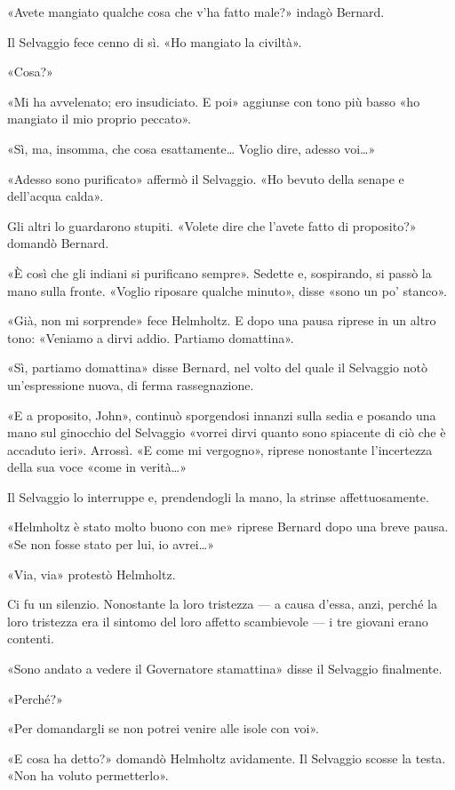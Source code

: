 \documentclass[
a5paper, %
10pt, %
twoside, 
onecolumn, %
openany, %
]{memoir}
\begin{document}
«Avete mangiato qualche cosa che v’ha fatto male?» indagò Bernard.

Il Selvaggio fece cenno di sì. «Ho mangiato la civiltà».

«Cosa?»

«Mi ha avvelenato; ero insudiciato. E poi» aggiunse con tono più basso «ho mangiato il mio proprio peccato».

«Sì, ma, insomma, che cosa esattamente… Voglio dire, adesso voi…»

«Adesso sono purificato» affermò il Selvaggio. «Ho bevuto della senape e dell’acqua calda».

Gli altri lo guardarono stupiti. «Volete dire che l’avete fatto di proposito?» domandò Bernard.

«È così che gli indiani si purificano sempre». Sedette e, sospirando, si passò la mano sulla fronte. «Voglio riposare qualche minuto», disse «sono un po’ stanco».

«Già, non mi sorprende» fece Helmholtz. E dopo una pausa riprese in un altro tono: «Veniamo a dirvi addio. Partiamo domattina».

«Sì, partiamo domattina» disse Bernard, nel volto del quale il Selvaggio notò un’espressione nuova, di ferma rassegnazione.

«E a proposito, John», continuò sporgendosi innanzi sulla sedia e posando una mano sul ginocchio del Selvaggio «vorrei dirvi quanto sono spiacente di ciò che è accaduto ieri». Arrossì. «E come mi vergogno», riprese nonostante l’incertezza della sua voce «come in verità…»

Il Selvaggio lo interruppe e, prendendogli la mano, la strinse affettuosamente.

«Helmholtz è stato molto buono con me» riprese Bernard dopo una breve pausa. «Se non fosse stato per lui, io avrei…»

«Via, via» protestò Helmholtz.

Ci fu un silenzio. Nonostante la loro tristezza — a causa d’essa, anzi, perché la loro tristezza era il sintomo del loro affetto scambievole — i tre giovani erano contenti.

«Sono andato a vedere il Governatore stamattina» disse il Selvaggio finalmente.

«Perché?»

«Per domandargli se non potrei venire alle isole con voi».

«E cosa ha detto?» domandò Helmholtz avidamente. Il Selvaggio scosse la testa. «Non ha voluto permetterlo».
\end{document}
